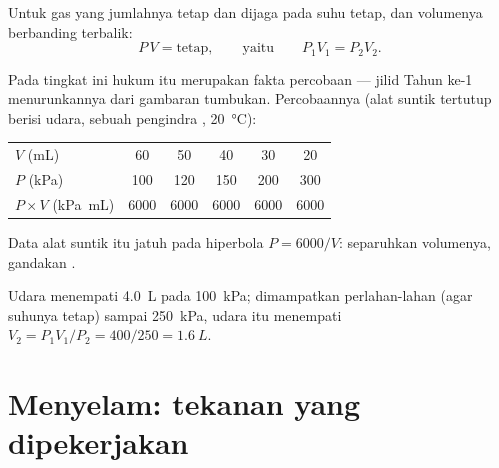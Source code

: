\begin{proposition}\label{prop:g10:pressure:boyle}
Untuk gas yang jumlahnya tetap dan dijaga pada suhu tetap,  dan
volumenya berbanding terbalik:
\[
P \, V = \text{tetap},
\qquad\text{yaitu}\qquad
P_1 V_1 = P_2 V_2 .
\]
\end{proposition}
\admitted

\begin{remark}
Pada tingkat ini hukum itu merupakan fakta percobaan --- jilid Tahun
ke-1 menurunkannya dari gambaran tumbukan. Percobaannya (alat suntik
tertutup berisi udara, sebuah pengindra ,
\qty{20}{\degreeCelsius}):
\begin{center}
\begin{tabular}{lccccc}
$V$ (\unit{mL}) & 60 & 50 & 40 & 30 & 20 \\
$P$ (\unit{kPa}) & 100 & 120 & 150 & 200 & 300 \\
$P \times V$ (\unit{kPa.mL}) & 6000 & 6000 & 6000 & 6000 & 6000
\end{tabular}
\end{center}
\end{remark}

\begin{omfigure}

{\small Data alat suntik itu jatuh pada hiperbola $P = 6000/V$: separuhkan volumenya, gandakan .}
\end{omfigure}

\begin{example}\label{ex:g10:pressure:boyle}
Udara menempati \qty{4.0}{L} pada \qty{100}{kPa}; dimampatkan
perlahan-lahan (agar suhunya tetap) sampai \qty{250}{kPa}, udara itu
menempati $V_2 = P_1 V_1 / P_2 = 400/250 = \qty{1.6}{L}$.
\end{example}

\section{Menyelam: tekanan yang dipekerjakan}

